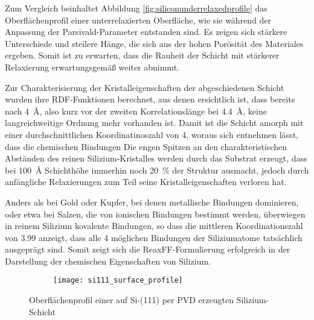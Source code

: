 Zum Vergleich beinhaltet Abbildung \ref{fig:siliconunderrelaxedprofile} das Oberflächenprofil einer unterrelaxierten Oberfläche, wie sie während der Anpassung der Parsivald-Parameter entstanden sind.
Es zeigen sich stärkere Unterschiede und steilere Hänge, die sich aus der hohen Porösität des Materiales ergeben.
Somit ist zu erwarten, dass die Rauheit der Schicht mit stärkerer Relaxierung erwartungsgemäß weiter abnimmt.

Zur Charakterisierung der Kristalleigenschaften der abgeschiedenen Schicht wurden ihre RDF-Funktionen berechnet, aus denen ersichtlich ist, dass bereits nach \SI{4}{\angstrom}, also kurz vor der zweiten Korrelationslänge bei \SI{4.4}{\angstrom}, keine langreichweitige Ordnung mehr vorhanden ist.
Damit ist die Schicht amorph mit einer durchschnittlichen Koordinatinoszahl von \num{4}, woraus sich entnehmen lässt, dass die chemischen Bindungen
Die engen Spitzen an den charakteristischen Abständen des reinen Silizium-Kristalles werden durch das Substrat erzeugt, dass bei \SI{100}{\angstrom} Schichthöhe immerhin noch \SI{20}{\percent} der Struktur ausmacht, jedoch durch anfängliche Relaxierungen zum Teil seine Kristalleigenschaften verloren hat.

Anders als bei Gold oder Kupfer, bei denen metallische Bindungen dominieren, oder etwa bei Salzen, die von ionischen Bindungen bestimmt werden, überwiegen in reinem Silizium kovalente Bindungen, so dass die mittleren Koordinationszahl von \num{3.99} anzeigt, dass alle 4 möglichen Bindungen der Siliziumatome tatsächlich ausgeprägt sind.
Somit zeigt sich die ReaxFF-Formulierung erfolgreich in der Darstellung der chemischen Eigenschaften von Silizium.

\begin{figure}[H]
  \centering
  \captionsetup[subfigure]{singlelinecheck=false}
  \begin{subfigure}[t]{7.1cm}
    \texttt{[image: si111\_surface\_profile]}
  \end{subfigure}
  \begin{subfigure}[t]{1.7cm}
    \def\svgwidth{\textwidth}
    
  \end{subfigure}
  \caption[Oberflächenprofil einer Silizium-PVD-Schicht]{Oberflächenprofil einer auf Si-(111) per PVD erzeugten Silizium-Schicht}
  \label{fig:siliconprofile}
\end{figure}

